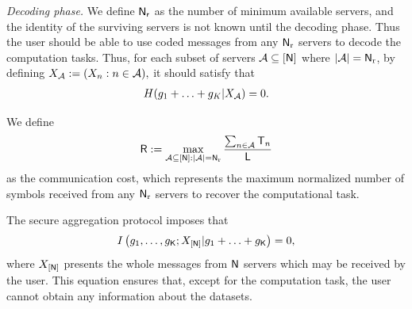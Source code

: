 \documentclass[conference,letterpaper]{IEEEtran}
\begin{document}
{\it Decoding phase.}
 We define ${\sf N_r}$ as  the number of minimum available servers, and the identity of the surviving servers is not known until the decoding phase. 
Thus the user should be able to use coded messages from any ${\sf N}_{\rm r}$  servers to decode the computation tasks. 
Thus, for each subset of servers ${\cal A} \subseteq [{\sf N}]$ where $|{\cal A}| = {\sf N}_{\rm r}$, by defining
$
    {X_{{\cal A}}}: = ( {X_n}:n \in {\cal A}), 
$
it should satisfy that
\begin{align}
    H(g_1+\ldots+g_K | X_{{\cal A}}) = 0.
\end{align}

We define 
\begin{equation}
    {\sf R}: = \mathop {\max }\limits_{{\cal A} \subseteq [{\sf N}]:|{\cal A}| = {{\sf N}_{\rm r}}} \frac{{\sum\nolimits_{n \in {\cal A}} {{{\sf T}_n}} }}{{\sf L}}
\end{equation} 
as the communication cost, which represents the maximum normalized number of symbols received from any ${\sf N}_{\rm r}$ servers to recover the computational task.

The secure aggregation protocol imposes that  
\begin{align}
    I\left(g_{1},\ldots, g_{{\sf K}};   X_{[{\sf N}]} | g_1+\ldots+g_{{\sf K}}  \right) = 0, \label{eq:security}
\end{align}
where $X_{[{\sf N}]}$ presents the whole messages from ${\sf N}$ servers which may be received by the user. This equation ensures that, except for the computation task, the user cannot obtain any information about the datasets.
\end{document}
